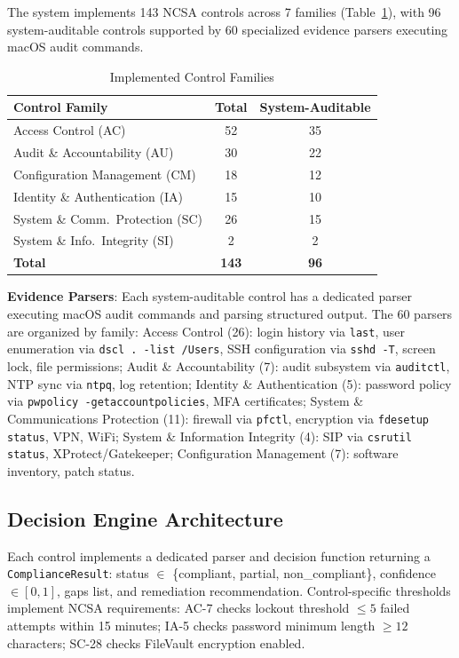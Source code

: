 \documentclass[11pt,conference]{IEEEtran}
\begin{document}
The system implements 143 NCSA controls across 7 families (Table~\ref{tab:controls}), with 96 system-auditable controls supported by 60 specialized evidence parsers executing macOS audit commands.

\begin{table}[!t]
\centering
\caption{Implemented Control Families}
\label{tab:controls}
\begin{tabular}{@{}lcc@{}}
\toprule
\textbf{Control Family} & \textbf{Total} & \textbf{System-Auditable} \\
\midrule
Access Control (AC) & 52 & 35 \\
Audit \& Accountability (AU) & 30 & 22 \\
Configuration Management (CM) & 18 & 12 \\
Identity \& Authentication (IA) & 15 & 10 \\
System \& Comm.\ Protection (SC) & 26 & 15 \\
System \& Info.\ Integrity (SI) & 2 & 2 \\
\midrule
\textbf{Total} & \textbf{143} & \textbf{96} \\
\bottomrule
\end{tabular}
\end{table}

\textbf{Evidence Parsers}: Each system-auditable control has a dedicated parser executing macOS audit commands and parsing structured output. The 60 parsers are organized by family: Access Control (26): login history via \texttt{last}, user enumeration via \texttt{dscl . -list /Users}, SSH configuration via \texttt{sshd -T}, screen lock, file permissions; Audit \& Accountability (7): audit subsystem via \texttt{auditctl}, NTP sync via \texttt{ntpq}, log retention; Identity \& Authentication (5): password policy via \texttt{pwpolicy -getaccountpolicies}, MFA certificates; System \& Communications Protection (11): firewall via \texttt{pfctl}, encryption via \texttt{fdesetup status}, VPN, WiFi; System \& Information Integrity (4): SIP via \texttt{csrutil status}, XProtect/Gatekeeper; Configuration Management (7): software inventory, patch status.

\subsection{Decision Engine Architecture}

Each control implements a dedicated parser and decision function returning a \texttt{ComplianceResult}: status $\in$ \{compliant, partial, non\_compliant\}, confidence $\in [0,1]$, gaps list, and remediation recommendation. Control-specific thresholds implement NCSA requirements: AC-7 checks lockout threshold $\leq 5$ failed attempts within 15 minutes; IA-5 checks password minimum length $\geq 12$ characters; SC-28 checks FileVault encryption enabled.
\end{document}
